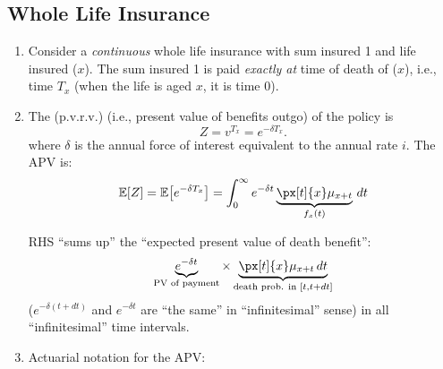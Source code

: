 \subsection{Whole Life Insurance}
\label{subsect:whole-life}
\begin{enumerate}
\subsubsection*{Continuous Case}
\item Consider a \emph{continuous} whole life insurance with sum insured 1
and life insured (\(x\)). The sum insured 1 is paid \emph{exactly at} time of
death of (\(x\)), i.e., time \(T_x\) (when the life is aged \(x\), it is time
0).

\item The  (p.v.r.v.) (i.e., present value
of benefits  outgo) of the policy is
\[
Z=v^{T_x}=e^{-\delta T_x}.
\]
where \(\delta\) is the annual force of interest equivalent to the annual rate
\(i\). The APV is:
\[
\expv{Z}=\expv{e^{-\delta T_x}}=\int_{0}^{\infty}e^{-\delta t}\underbrace{\px[t]{x}\mu_{x+t}}_{f_x(t)}\,dt
\]
\begin{intuition}
RHS ``sums up'' the ``expected present value of death benefit'':
\[\underbrace{e^{-\delta t}}_{\text{PV of payment}}\times \underbrace{\px[t]{x}\mu_{x+t}\,dt}_{\text{death prob. in }[t,t+dt]}\]
(\(e^{-\delta(t+dt)}\) and \(e^{-\delta t}\) are ``the same'' in
``infinitesimal'' sense) in all ``infinitesimal'' time intervals.
\end{intuition}
\item Actuarial notation for the APV:



\end{enumerate}
